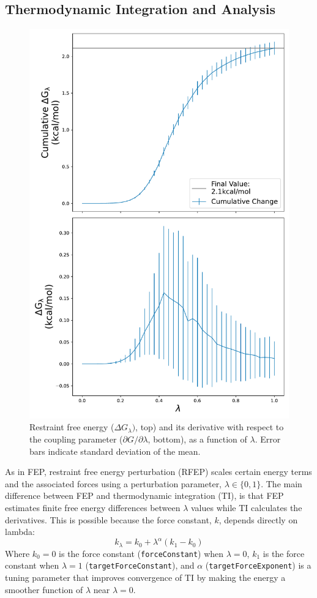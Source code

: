 \documentclass[9pt,tutorial]{Styling/livecoms}
\begin{document}
\subsection{Thermodynamic Integration and Analysis}
\begin{figure}[!htb]
    \includegraphics[width=0.95\linewidth]{RFEP}
    \caption{Restraint free energy ($\Delta G_\lambda)$, top) and its derivative with respect to the coupling parameter ($\partial G/\partial\lambda$, bottom), as a function of $\lambda$. Error bars indicate standard deviation of the mean.
    }\label{fig:RFEP2}
\end{figure}
As in FEP, restraint free energy perturbation (RFEP) scales certain energy terms and the associated forces using a perturbation parameter, $\lambda\in \{0,1\}$.
The main difference between FEP and thermodynamic integration (TI), is that FEP estimates finite free energy differences between $\lambda$ values while TI calculates the derivatives. This is possible because the force constant, $k$, depends directly on lambda:
 \begin{equation}\label{eq:kl}
     k_\lambda = k_0 + \lambda^\alpha (k_1-k_0)
 \end{equation}
Where $k_0 = 0$ is the force constant (\texttt{forceConstant}) when $\lambda=0$, $k_1$ is the  force constant when $\lambda=1$ (\texttt{targetForceConstant}), and $\alpha$ (\texttt{targetForceExponent}) is a tuning parameter that improves convergence of TI by making the energy a smoother function of $\lambda$ near $\lambda=0$.
\end{document}
